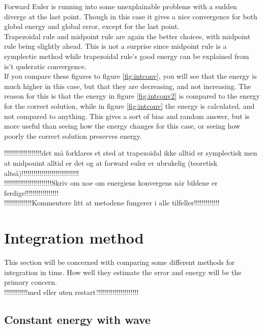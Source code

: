 Forward Euler is running into some unexplainable problems with a sudden diverge at the last point. Though in this case it gives a nice convergence for both global energy and global error, except for the last point. \\

Trapezoidal rule and midpoint rule are again the better choices, with midpoint rule being slightly ahead. This is not a surprise since midpoint rule is a symplectic method while trapezoidal rule's good energy can be explained from is't quderatic convergence. \\

If you compare these figures to figure \ref{fig:intconv}, you will see that the energy is much higher in this case, but that they are decreasing, and not increasing. The reason for this is that the energy in figure \ref{fig:intconv2} is compared to the energy for the correct solution, while in figure \ref{fig:intconv} the energy is calculated, and not compared to anything. This gives a sort of bias and random answer, but is more useful than seeing how the energy changes for this case, or seeing how poorly the correct solution preserves energy.

!!!!!!!!!!!!!!!!!!!det må forklares et sted at trapezoidal ikke alltid er symplectisk men at midpouint alltid er det og at forward euler er ubrukelig (teoretisk altså)!!!!!!!!!!!!!!!!!!!!!!!!!!!!!\\

!!!!!!!!!!!!!!!!!!!!!!!!Skriv om noe om energiens konvergens når bildene er ferdige!!!!!!!!!!!!!!!!!\\

!!!!!!!!!!!!!!Kommentere litt at metodene fungerer i alle tilfeller!!!!!!!!!!!!!\\
\section{Integration method} %
This section will be concerned with comparing some different methods for integration in time. How well they estimate the error and energy will be the primary concern. \\
!!!!!!!!!!!!med eller uten restart?!!!!!!!!!!!!!!!!!!!!\\
\subsection{Constant energy with wave}%

